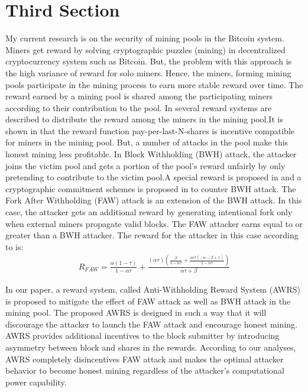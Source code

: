 \documentclass[conference]{IEEEtran}
\begin{document}
\section{Third Section}
My current research is on the security of mining pools in the Bitcoin system. Miners get reward by solving cryptographic puzzles (mining) in decentralized cryptocurrency system such as Bitcoin. But, the problem with this approach is the high variance of reward for solo miners. Hence, the miners, forming mining pools participate in the mining process to earn more stable reward over time. The reward earned by a mining pool is shared among the participating miners according to their contribution to the pool. In \cite{rosenfeld2011analysis} several reward systems are described to distribute the reward among the miners in the mining pool.It is shown in \cite{schrijvers2016incentive} that the reward function pay-per-last-N-shares is incentive compatible for miners in the mining pool. But, a number of attacks in the pool make this honest mining less profitable. In Block Withholding (BWH) attack, the attacker joins the victim pool and gets a portion of the pool’s reward unfairly by only pretending to contribute to the victim pool.A special reward is proposed in \cite{bag2016yet} and a cryptographic commitment schemes is proposed in \cite{bag2017bitcoin} to counter BWH attack. The Fork After Withholding (FAW) attack is an extension of the BWH attack. In this case, the attacker gets an additional reward by generating intentional fork only when external miners propagate valid blocks. The FAW attacker earns equal to or greater than a BWH attacker. The reward for the attacker in this case according to \cite{kwon2017selfish} is:
\begin{eqnarray}
R_{FAW}=\frac{\alpha  (1-\tau )}{1-\alpha  \tau }+\frac{(\alpha  \tau ) \left(\frac{\beta }{1-\alpha  \tau }+\frac{\alpha  c \tau  (-\alpha -\beta +1)}{1-\alpha  \tau }\right)}{\alpha  \tau +\beta }
\end{eqnarray}

In our paper, a reward system, called Anti-Withholding Reward System (AWRS) is proposed to mitigate the effect of FAW attack as well as BWH attack in the mining pool. The proposed AWRS is designed in such a way that it will discourage the attacker to launch the FAW attack and encourage honest mining. AWRS provides additional incentives to the block submitter by introducing asymmetry between block and shares in the rewards. According to our analyses, AWRS completely disincentives FAW attack and makes the optimal attacker behavior to become honest mining regardless of the attacker's computational power capability.



\end{document}
